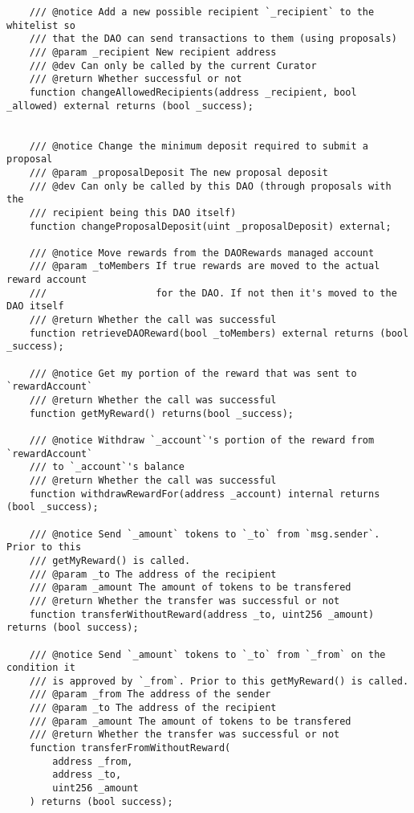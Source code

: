 \documentclass[9pt,oneside]{amsart}
\begin{document}
\begin{appendix}
\begin{verbatim}
    /// @notice Add a new possible recipient `_recipient` to the whitelist so
    /// that the DAO can send transactions to them (using proposals)
    /// @param _recipient New recipient address
    /// @dev Can only be called by the current Curator
    /// @return Whether successful or not
    function changeAllowedRecipients(address _recipient, bool _allowed) external returns (bool _success);


    /// @notice Change the minimum deposit required to submit a proposal
    /// @param _proposalDeposit The new proposal deposit
    /// @dev Can only be called by this DAO (through proposals with the
    /// recipient being this DAO itself)
    function changeProposalDeposit(uint _proposalDeposit) external;

    /// @notice Move rewards from the DAORewards managed account
    /// @param _toMembers If true rewards are moved to the actual reward account
    ///                   for the DAO. If not then it's moved to the DAO itself
    /// @return Whether the call was successful
    function retrieveDAOReward(bool _toMembers) external returns (bool _success);

    /// @notice Get my portion of the reward that was sent to `rewardAccount`
    /// @return Whether the call was successful
    function getMyReward() returns(bool _success);

    /// @notice Withdraw `_account`'s portion of the reward from `rewardAccount`
    /// to `_account`'s balance
    /// @return Whether the call was successful
    function withdrawRewardFor(address _account) internal returns (bool _success);

    /// @notice Send `_amount` tokens to `_to` from `msg.sender`. Prior to this
    /// getMyReward() is called.
    /// @param _to The address of the recipient
    /// @param _amount The amount of tokens to be transfered
    /// @return Whether the transfer was successful or not
    function transferWithoutReward(address _to, uint256 _amount) returns (bool success);

    /// @notice Send `_amount` tokens to `_to` from `_from` on the condition it
    /// is approved by `_from`. Prior to this getMyReward() is called.
    /// @param _from The address of the sender
    /// @param _to The address of the recipient
    /// @param _amount The amount of tokens to be transfered
    /// @return Whether the transfer was successful or not
    function transferFromWithoutReward(
        address _from,
        address _to,
        uint256 _amount
    ) returns (bool success);


\end{verbatim}
\end{appendix}
\end{document}
